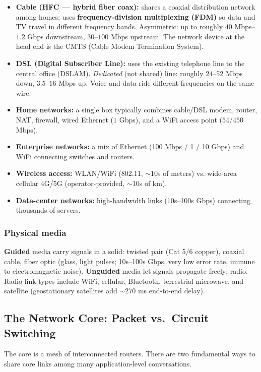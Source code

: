 \documentclass[hidelinks]{article}
\begin{document}
\begin{itemize}
    \item \textbf{Cable (HFC --- hybrid fiber coax):} shares a coaxial
    distribution network among homes; uses \textbf{frequency-division
    multiplexing (FDM)} so data and TV travel in different frequency
    bands. Asymmetric: up to roughly $40$ Mbps--$1.2$ Gbps downstream,
    $30$--$100$ Mbps upstream. The network device at the head end is the
    CMTS (Cable Modem Termination System).
    \item \textbf{DSL (Digital Subscriber Line):} uses the existing
    telephone line to the central office (DSLAM). \emph{Dedicated} (not
    shared) line: roughly $24$--$52$ Mbps down, $3.5$--$16$ Mbps up.
    Voice and data ride different frequencies on the same wire.
    \item \textbf{Home networks:} a single box typically combines cable/DSL
    modem, router, NAT, firewall, wired Ethernet ($1$ Gbps), and a WiFi
    access point ($54$/$450$ Mbps).
    \item \textbf{Enterprise networks:} a mix of Ethernet (100 Mbps / 1 / 10
    Gbps) and WiFi connecting switches and routers.
    \item \textbf{Wireless access:} WLAN/WiFi (802.11, $\sim$10s of meters)
    vs. wide-area cellular 4G/5G (operator-provided, $\sim$10s of km).
    \item \textbf{Data-center networks:} high-bandwidth links (10s--100s
    Gbps) connecting thousands of servers.
\end{itemize}

\subsubsection{Physical media}
\textbf{Guided} media carry signals in a solid: twisted pair (Cat 5/6
copper), coaxial cable, fiber optic (glass, light pulses; 10s--100s Gbps,
very low error rate, immune to electromagnetic noise). \textbf{Unguided}
media let signals propagate freely: radio. Radio link types include WiFi,
cellular, Bluetooth, terrestrial microwave, and satellite (geostationary
satellites add $\sim$270 ms end-to-end delay).

\subsection{The Network Core: Packet vs.\ Circuit Switching}

The core is a mesh of interconnected routers. There are two fundamental
ways to share core links among many application-level conversations.
\end{document}
